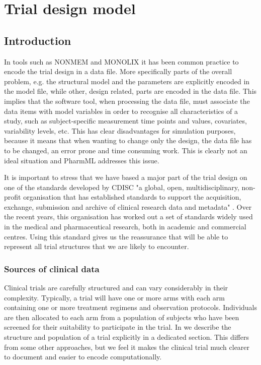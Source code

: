 \chapter{Trial design model}
\label{sec:CTS}
\label{maths:epoch-defn}

\section{Introduction}

In tools such as NONMEM and MONOLIX it has been common practice to encode the trial design in a data file.
More specifically parts of the overall problem, e.g. the structural model and the parameters are explicitly
encoded in the model file, while other, design related, parts are encoded in the data file. This implies
that the software tool, when processing the data file, must associate the data items with model variables
in order to recognise all characteristics of a study, such as subject-specific measurement time points
and values, covariates, variability levels, etc. This has clear disadvantages for simulation purposes,
because it means that when wanting to change only the design, the data file has to be changed, an error
prone and time consuming work. This is clearly not an ideal situation and PharmML addresses this issue.

It is important to stress that we have based a major part of the trial design on one of the standards 
developed by CDISC "a global, open, multidisciplinary, non-profit organisation that has established 
standards to support the acquisition, exchange, submission and archive of clinical research data 
and metadata" \cite{CDICS:2013}. Over the recent years, this organisation has worked out a set of 
standards widely used in the medical and pharmaceutical research, both in academic and commercial centres. 
Using this standard gives us the reassurance that \pharmml will be able
to represent all trial structures that we are likely to encounter. 


\subsection{Sources of clinical data}

Clinical trials are carefully structured and can vary considerably in
their complexity. Typically, a trial will have one or more arms with
each arm containing one or more treatment regimens and observation
protocols. Individuals are then allocated to each arm from a population
of subjects who have been screened for their suitability to participate
in the trial. In \pharmml we describe the structure and population of a
trial explicitly in a dedicated section. This differs from some other
approaches, but we feel it makes the clinical trial much clearer to
document and easier to encode computationally.



